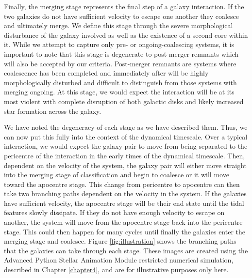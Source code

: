 Finally, the merging stage represents the final step of a galaxy interaction. If the two galaxies do not have sufficient velocity to escape one another they coalesce and ultimately merge. We define this stage through the severe morphological disturbance of the galaxy involved as well as the existence of a second core within it. While we attempt to capture only pre- or ongoing-coalescing systems, it is important to note that this stage is degenerate to post-merger remnants which will also be accepted by our criteria. Post-merger remnants are systems where coalescence has been completed and immediately after will be highly morphologically disturbed and difficult to distinguish from those systems with merging ongoing. At this stage, we would expect the interaction will be at its most violent with complete disruption of both galactic disks and likely increased star formation across the galaxy. 

We have noted the degeneracy of each stage as we have described them. Thus, we can now put this fully into the context of the dynamical timescale. Over a typical interaction, we would expect the galaxy pair to move from being separated to the pericentre of the interaction in the early times of the dynamical timescale. Then, dependent on the velocity of the system, the galaxy pair will either move straight into the merging stage of classification and begin to coalesce or it will move toward the apocentre stage. This change from pericentre to apocentre can then take two branching paths dependent on the velocity in the system. If the galaxies have sufficient velocity, the apocentre stage will be their end state until the tidal features slowly dissipate. If they do not have enough velocity to escape on another, the system will move from the apocentre stage back into the pericentre stage. This could then happen for many cycles until finally the galaxies enter the merging stage and coalesce. Figure \ref{fig:illustration} shows the branching paths that the galaxies can take through each stage. These images are created using the Advanced Python Stellar Animation Module restricted numerical simulation, described in Chapter \ref{chapter4}, and are for illustrative purposes only here.

